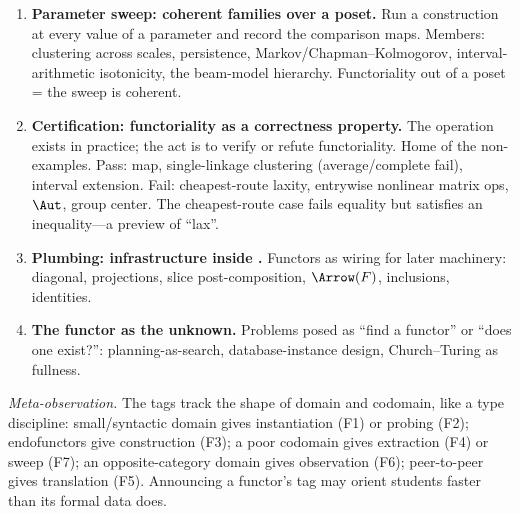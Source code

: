 {\begin{enumerate}
\item[F7.] \textbf{Parameter sweep: coherent families over a poset.}
Run a construction at every value of a parameter and record the comparison maps.
Members: clustering across scales, persistence, Markov/Chapman--Kolmogorov, interval-arithmetic isotonicity, the beam-model hierarchy.
Functoriality out of a poset = the sweep is coherent.

\item[F8.] \textbf{Certification: functoriality as a correctness property.}
The operation exists in practice; the act is to verify or refute functoriality.
Home of the non-examples.
Pass: map, single-linkage clustering (average/complete fail), interval extension.
Fail: cheapest-route laxity, entrywise nonlinear matrix ops, $\Aut$, group center.
The cheapest-route case fails equality but satisfies an inequality---a preview of ``lax''.

\item[F9.] \textbf{Plumbing: infrastructure inside \Category.}
Functors as wiring for later machinery: diagonal, projections, slice post-composition, $\Arrow(F)$, inclusions, identities.

\item[F10.] \textbf{The functor as the unknown.}
Problems posed as ``find a functor'' or ``does one exist?'': planning-as-search, database-instance design, Church--Turing as fullness.
\end{enumerate}

\emph{Meta-observation.}
The tags track the shape of domain and codomain, like a type discipline:
small/syntactic domain gives instantiation (F1) or probing (F2); endofunctors give construction (F3); a poor codomain gives extraction (F4) or sweep (F7); an opposite-category domain gives observation (F6); peer-to-peer gives translation (F5).
Announcing a functor's tag may orient students faster than its formal data does.

}


